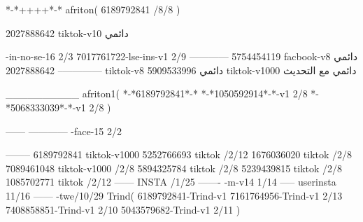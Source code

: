 *-*++++*-*
afriton(
6189792841 /8/8
)

2027888642 tiktok-v10
دائمي

-in-no-se-16 2/3
7017761722-lse-ins-v1 2/9
------------
5754454119 facbook-v8
دائمي
--------------
2027888642 tiktok-v8
دائمي
5909533996 tiktok-v1000
دائمي مع التحديث

__________
afriton1(
*-*6189792841*-*
*-*1050592914*-*-v1 2/8
*-*5068333039*-*-v1 2/8
)

------
------------
-face-15 2/2

--------
6189792841 tiktok-v1000
5252766693 tiktok /2/12
1676036020 tiktok /2/8
7089461048 tiktok-v1000 /2/8
5894325784 tiktok /2/8
5239439815 tiktok /2/8
1085702771 tiktok /2/12
------
 INSTA /1/25
-------
-m-v14 1/14
-----
userinsta 11/16
------
-twe/10/29
Trind(
6189792841-Trind-v1 
7161764956-Trind-v1 2/13
7408858851-Trind-v1 2/10
5043579682-Trind-v1 2/11
)
